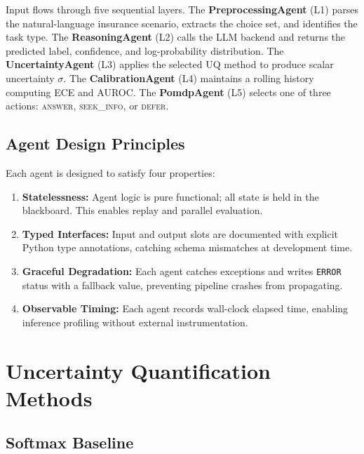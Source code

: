 \documentclass[conference]{IEEEtran}
\begin{document}
Input flows through five sequential layers. The
\textbf{PreprocessingAgent} (L1) parses the natural-language
insurance scenario, extracts the choice set, and identifies the task
type. The \textbf{ReasoningAgent} (L2) calls the LLM backend and
returns the predicted label, confidence, and log-probability
distribution. The \textbf{UncertaintyAgent} (L3) applies the selected
UQ method to produce scalar uncertainty $\sigma$. The
\textbf{CalibrationAgent} (L4) maintains a rolling history computing
ECE and AUROC. The \textbf{PomdpAgent} (L5) selects one of three
actions: \textsc{answer}, \textsc{seek\_info}, or \textsc{defer}.

\subsection{Agent Design Principles}

Each agent is designed to satisfy four properties:
\begin{enumerate}[leftmargin=*]
    \item \textbf{Statelessness:} Agent logic is pure functional; all
          state is held in the blackboard. This enables replay and
          parallel evaluation.
    \item \textbf{Typed Interfaces:} Input and output slots are
          documented with explicit Python type annotations, catching
          schema mismatches at development time.
    \item \textbf{Graceful Degradation:} Each agent catches exceptions
          and writes \texttt{ERROR} status with a fallback value,
          preventing pipeline crashes from propagating.
    \item \textbf{Observable Timing:} Each agent records wall-clock
          elapsed time, enabling inference profiling without external
          instrumentation.
\end{enumerate}

\section{Uncertainty Quantification Methods}
\label{sec:uq}

\subsection{Softmax Baseline}
\end{document}
